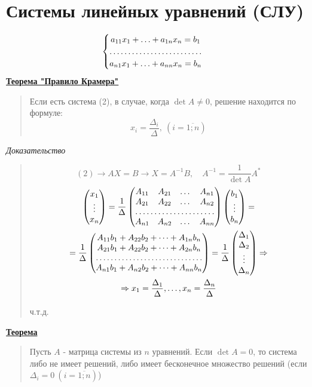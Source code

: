\documentclass[11pt]{proc}
\begin{document}
\section{Системы линейных уравнений (СЛУ)}
	\begin{equation}
		\begin{cases}
			\begin{matrix}
				a_{11}x_1+\ldots+a_{1n}x_n=b_1\\
				\hdotsfor{1}\\
				a_{n1}x_1+\ldots+a_{nn}x_n=b_n
			\end{matrix}
		\end{cases}
	\end{equation}
	\underline{\textbf{Теорема "Правило Крамера"}}
	\begin{quote}
		Если есть система (2), в случае, когда $\det{A} \neq 0$, решение находится по формуле:
		\[x_i=\frac{\Delta_i}{\Delta},\ (i=\overline{1;n})\]
	\end{quote}
	\pagebreak
	\emph{Доказательство}
	\begin{quote}
		\[(2)\rightarrow AX=B \rightarrow X=A^{-1}B,\quad A^{-1}=\frac1{\det{A}}A^*\]
		\begin{multline*}
			\begin{pmatrix}x_1 \\ \vdots \\ x_n\end{pmatrix}=\frac1{\Delta}\begin{pmatrix}A_{11} & A_{21} & \dots & A_{n1} \\ A_{21} & A_{22} & \dots & A_{n2} \\ \hdotsfor{4} \\ A_{n1} & A_{n2} & \dots & A_{nn}\end{pmatrix}\begin{pmatrix}b_1 \\ \vdots \\ b_n\end{pmatrix}=\\
			=\frac1{\Delta}\begin{pmatrix}A_{11}b_1+A_{22}b_2+\dots+A_{1n}b_n\\A_{21}b_1+A_{22}b_2+\dots+A_{2n}b_n\\ \hdotsfor{1}\\ A_{n1}b_1+A_{n2}b_2+\dots+A_{nn}b_n\end{pmatrix}=\frac1\Delta\begin{pmatrix}\Delta_1 \\ \Delta_2 \\ \vdots \\ \Delta_n\end{pmatrix}\Rightarrow\\ \Rightarrow x_1=\frac{\Delta_1}\Delta,\ldots,x_n=\frac{\Delta_n}\Delta
		\end{multline*}
		\begin{flushright}ч.т.д.\end{flushright}
	\end{quote}
	\underline{\textbf{Теорема}}
	\begin{quote}
		Пусть $A$ - матрица системы из $n$ уравнений. Если $\det{A}=0$, то система либо не имеет решений, либо имеет бесконечное множество решений (если $\Delta_i=0\ (i=\overline{1;n})$)
	\end{quote}
\end{document}
